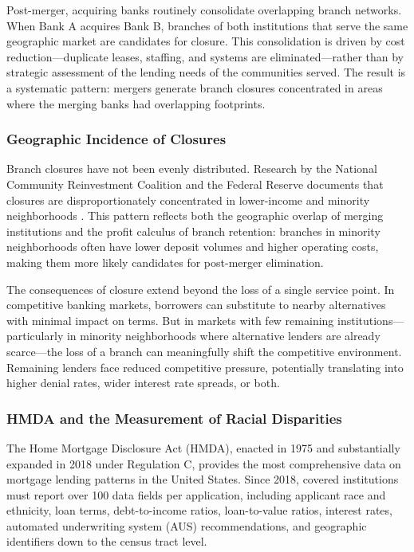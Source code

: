\documentclass[12pt]{article}
\begin{document}
Post-merger, acquiring banks routinely consolidate overlapping branch networks. When Bank A acquires Bank B, branches of both institutions that serve the same geographic market are candidates for closure. This consolidation is driven by cost reduction---duplicate leases, staffing, and systems are eliminated---rather than by strategic assessment of the lending needs of the communities served. The result is a systematic pattern: mergers generate branch closures concentrated in areas where the merging banks had overlapping footprints.

\subsubsection*{Geographic Incidence of Closures} Branch closures have not been evenly distributed. Research by the National Community Reinvestment Coalition and the Federal Reserve documents that closures are disproportionately concentrated in lower-income and minority neighborhoods \citep{ergungor2010}. This pattern reflects both the geographic overlap of merging institutions and the profit calculus of branch retention: branches in minority neighborhoods often have lower deposit volumes and higher operating costs, making them more likely candidates for post-merger elimination.

The consequences of closure extend beyond the loss of a single service point. In competitive banking markets, borrowers can substitute to nearby alternatives with minimal impact on terms. But in markets with few remaining institutions---particularly in minority neighborhoods where alternative lenders are already scarce---the loss of a branch can meaningfully shift the competitive environment. Remaining lenders face reduced competitive pressure, potentially translating into higher denial rates, wider interest rate spreads, or both.

\subsubsection*{HMDA and the Measurement of Racial Disparities} The Home Mortgage Disclosure Act (HMDA), enacted in 1975 and substantially expanded in 2018 under Regulation C, provides the most comprehensive data on mortgage lending patterns in the United States. Since 2018, covered institutions must report over 100 data fields per application, including applicant race and ethnicity, loan terms, debt-to-income ratios, loan-to-value ratios, interest rates, automated underwriting system (AUS) recommendations, and geographic identifiers down to the census tract level.
\end{document}
